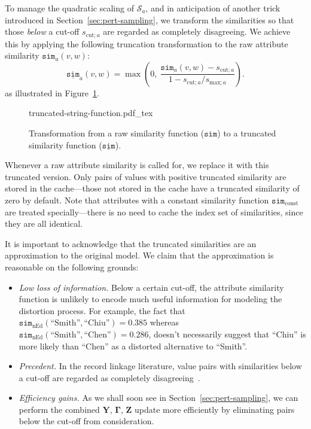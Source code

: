 \documentclass[12pt,letterpaper]{article}
\renewcommand\vec{\bm}
\newcommand{\simfn}{\mathtt{sim}} %
\newcommand{\truncsimfn}{\underline{\simfn}} %
\newcommand{\1}[1]{\mathbb{I}\!\left[#1\right]} %
\begin{document}
To manage the quadratic scaling of $\mathcal{S}_{a}$, and 
in anticipation of another trick introduced in 
Section~\ref{sec:pert-sampling}, we transform the similarities so that 
those \emph{below} a cut-off $s_{\mathrm{cut};a}$ are regarded 
as completely disagreeing.
We achieve this by applying the following truncation transformation 
to the raw attribute similarity $\simfn_{a}(v,w)$:
\begin{equation}
\truncsimfn_{a}(v,w) = 
  \max \left(0, \ \frac{\simfn_{a}(v,w) - s_{\mathrm{cut};a}}
    {1 - s_{\mathrm{cut};a}/s_{\mathrm{max};a}} \right).
\end{equation}
as illustrated in Figure~\ref{fig:truncated-sim-fn}.
\begin{figure}
  \centering
  \def\svgwidth{0.45\linewidth}
  {truncated-string-function.pdf_tex}
  \caption{Transformation from a raw similarity function 
    ($\simfn$) to a truncated similarity 
    function ($\truncsimfn$).}
  \label{fig:truncated-sim-fn}
\end{figure}
Whenever a raw attribute similarity is called for, we 
replace it with this truncated version.
Only pairs of values with positive truncated similarity are stored 
in the cache---those not stored in the cache have a truncated 
similarity of zero by default.
Note that attributes with a constant similarity function 
$\simfn_{\mathrm{const}}$ are treated specially---there is no 
need to cache the index set of similarities, since they are all 
identical.

It is important to acknowledge that the truncated similarities 
are an approximation to the original model.
We claim that the approximation is reasonable on the following grounds:
\begin{itemize}
  \item \emph{Low loss of information.} 
  Below a certain cut-off, the attribute similarity function is
  unlikely to encode much useful information for modeling the 
  distortion process.
  For example, the fact that
  $\simfn_\mathrm{nEd}(\text{``Smith''},\text{``Chiu''}) = 0.385$ 
  whereas 
  $\simfn_\mathrm{nEd}(\text{``Smith''},\text{``Chen''}) = 0.286$, 
  doesn't necessarily suggest that ``Chiu'' is more likely 
  than ``Chen'' as a distorted alternative to ``Smith''.
  \item \emph{Precedent.}
  In the record linkage literature, value pairs with similarities 
  below a cut-off are regarded as completely 
  disagreeing~\citep{winkler_methods_2002, enamorado_using_2019}.
  \item \emph{Efficiency gains.} 
  As we shall soon see in Section~\ref{sec:pert-sampling}, 
  we can perform the combined $\vec{Y}$, $\vec{\Gamma}$, $\vec{Z}$ 
  update more efficiently by eliminating pairs below the cut-off from 
  consideration. 
\end{itemize}
\end{document}
